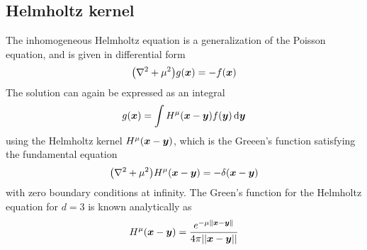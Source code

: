 \subsection{Helmholtz kernel}
The inhomogeneous Helmholtz equation is a generalization of the Poisson equation,
and is given in differential form
\begin{equation}
    \big(\nabla^2 + \mu^2\big) g(\boldsymbol x) = -f(\boldsymbol x)
\end{equation}
The solution can again be expressed as an integral
\begin{equation}
    g(\boldsymbol x) = \int H^\mu(\boldsymbol x-\boldsymbol y)f(\boldsymbol y)\,\mathrm{d}\boldsymbol y
\end{equation}
using the Helmholtz kernel $H^\mu(\boldsymbol x-\boldsymbol y)$, which is the Greeen's function 
satisfying the fundamental equation
\begin{equation}
    \label{eq:fundamental_helmholtz}
    \big(\nabla^2 + \mu^2\big) H^\mu(\boldsymbol x-\boldsymbol y) = -\delta(\boldsymbol x-\boldsymbol y)
\end{equation}
with zero boundary conditions at infinity. The Green's function for the Helmholtz 
equation for $d=3$ is known analytically as
\begin{equation}
    \label{eq:helmholtz_kern}
    H^\mu(\boldsymbol x-\boldsymbol y) = \frac{e^{-\mu\|\boldsymbol x-\boldsymbol y\|}}{4\pi||\boldsymbol x-\boldsymbol y||}
\end{equation}

